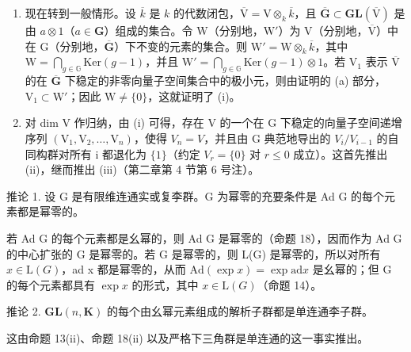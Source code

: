 \begin{enumerate}
\def\labelenumi{(\alph{enumi})}
\setcounter{enumi}{1}
\item
  现在转到一般情形。设 \(\overline{k}\) 是 \(k\) 的代数闭包，\(\overline{\mathrm{V}} = \mathrm{V} \otimes_k \overline{k}\)，且 \(\overline{\mathbf{G}} \subset \mathbf{GL}(\overline{\mathrm{V}})\) 是由 \(a \otimes 1\)（\(a \in \mathbf{G}\)）组成的集合。令 \(\mathrm{W}\)（分别地，\(\mathrm{W}'\)）为 \(\mathrm{V}\)（分别地，\(\overline{\mathrm{V}}\)）中在 \(\mathrm{G}\)（分别地，\(\overline{\mathbf{G}}\)）下不变的元素的集合。则 \(\mathrm{W}' = \mathrm{W} \otimes_k \overline{k}\)，其中 \(\mathrm{W} = \bigcap_{g \in \mathbb{G}} \mathrm{Ker}(g - 1)\)，并且 \(\mathrm{W}' = \bigcap_{g \in \mathbb{G}} \mathrm{Ker}(g - 1) \otimes 1\)。若 \(\mathrm{V}_1\) 表示 \(\overline{\mathrm{V}}\) 的在 \(\overline{\mathbf{G}}\) 下稳定的非零向量子空间集合中的极小元，则由证明的 (a) 部分，\(\mathrm{V}_1 \subset \mathrm{W}'\)；因此 \(\mathrm{W} \neq \{0\}\)，这就证明了 (i)。
\item
  对 dim V 作归纳，由 (i) 可得，存在 V 的一个在 G 下稳定的向量子空间递增序列 \(\left(\mathrm{V}_{1},\mathrm{V}_{2},\ldots,\mathrm{V}_{n}\right)\)，使得 \(V_{n}=V\)，并且由 G 典范地导出的 \(V_{i}/V_{i-1}\) 的自同构群对所有 i 都退化为 \(\{1\}\)（约定 \(V_{r}=\{0\}\) 对 \(r\leqslant0\) 成立）。这首先推出 (ii)，继而推出 (iii)（第二章第 4 节第 6 号注）。
\end{enumerate}

推论 1. 设 G 是有限维连通实或复李群。G 为幂零的充要条件是 Ad G 的每个元素都是幂零的。

若 Ad G 的每个元素都是幺幂的，则 Ad G 是幂零的（命题 18），因而作为 Ad G 的中心扩张的 G 是幂零的。若 G 是幂零的，则 L(G) 是幂零的，所以对所有 \(x \in \mathrm{L}(G)\)，ad x 都是幂零的，从而 \(\mathrm{Ad}(\exp x) = \exp \mathrm{ad} x\) 是幺幂的；但 G 的每个元素都具有 \(\exp x\) 的形式，其中 \(x \in \mathrm{L}(G)\)（命题 14）。

推论 2. \(\mathbf{GL}(n, \mathbf{K})\) 的每个由幺幂元素组成的解析子群都是单连通李子群。

这由命题 13(ii)、命题 18(ii) 以及严格下三角群是单连通的这一事实推出。

